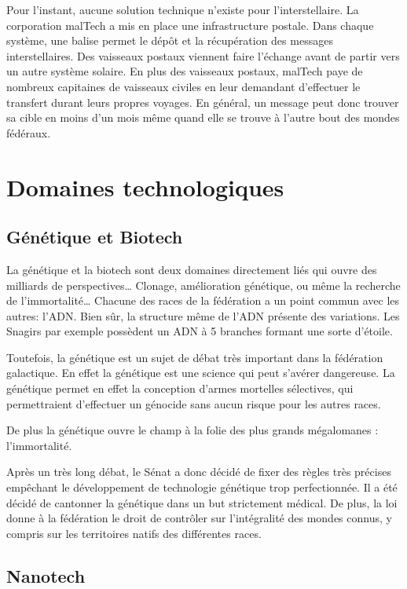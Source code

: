 \begin{multicols}{2}
Pour l'instant, aucune solution technique n'existe pour l'interstellaire. La corporation malTech a mis en place une infrastructure postale. Dans chaque système, une balise permet le dépôt et la récupération des messages interstellaires. Des vaisseaux postaux viennent faire l'échange avant de partir vers un autre système solaire. En plus des vaisseaux postaux, malTech paye de nombreux capitaines de vaisseaux civiles en leur demandant d'effectuer le transfert durant leurs propres voyages. En général, un message peut donc trouver sa cible en moins d'un mois même quand elle se trouve à l'autre bout des mondes fédéraux.

\section{Domaines technologiques}

\subsection{Génétique et Biotech}

La génétique et la biotech sont deux domaines directement liés qui ouvre des milliards de perspectives… Clonage, amélioration génétique, ou même la recherche de l’immortalité… Chacune des races de la fédération a un point commun avec les autres: l’ADN. Bien sûr, la structure même de l’ADN présente des variations. Les Snagirs par exemple possèdent un ADN à 5 branches formant une sorte d’étoile. 

Toutefois, la génétique est un sujet de débat très important dans la fédération galactique. En effet la génétique est une science qui peut s’avérer dangereuse. La génétique permet en effet la conception d’armes mortelles sélectives, qui permettraient d’effectuer un génocide sans aucun risque pour les autres races. 

De plus la génétique ouvre le champ à la folie des plus grands mégalomanes : l’immortalité.

Après un très long débat, le Sénat a donc décidé de fixer des règles très précises empêchant le développement de technologie génétique trop perfectionnée. Il a été décidé de cantonner la génétique dans un but strictement médical. De plus, la loi donne à la fédération le droit de contrôler sur l’intégralité des mondes connus, y compris sur les territoires natifs des différentes races.

\subsection{Nanotech}


\end{multicols}

